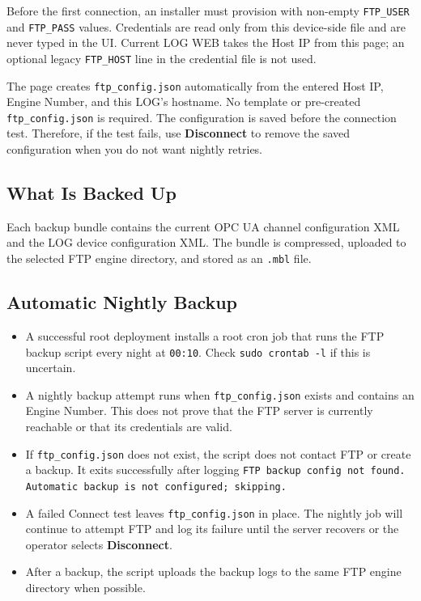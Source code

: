 \documentclass[11pt,a4paper]{article}
\begin{document}
Before the first connection, an installer must provision  with non-empty \texttt{FTP\_USER} and \texttt{FTP\_PASS} values. Credentials are read only from this device-side file and are never typed in the UI. Current LOG WEB takes the Host IP from this page; an optional legacy \texttt{FTP\_HOST} line in the credential file is not used.

The page creates \texttt{ftp\_config.json} automatically from the entered Host IP, Engine Number, and this LOG's hostname. No template or pre-created \texttt{ftp\_config.json} is required. The configuration is saved before the connection test. Therefore, if the test fails, use \textbf{Disconnect} to remove the saved configuration when you do not want nightly retries.

\subsection{What Is Backed Up}
Each backup bundle contains the current OPC UA channel configuration XML and the LOG device configuration XML. The bundle is compressed, uploaded to the selected FTP engine directory, and stored as an \texttt{.mbl} file.

\subsection{Automatic Nightly Backup}
\begin{itemize}
\item A successful root deployment installs a root cron job that runs the FTP backup script every night at \texttt{00:10}. Check \texttt{sudo crontab -l} if this is uncertain.
\item A nightly backup attempt runs when \texttt{ftp\_config.json} exists and contains an Engine Number. This does not prove that the FTP server is currently reachable or that its credentials are valid.
\item If \texttt{ftp\_config.json} does not exist, the script does not contact FTP or create a backup. It exits successfully after logging \texttt{FTP backup config not found. Automatic backup is not configured; skipping.}
\item A failed Connect test leaves \texttt{ftp\_config.json} in place. The nightly job will continue to attempt FTP and log its failure until the server recovers or the operator selects \textbf{Disconnect}.
\item After a backup, the script uploads the backup logs to the same FTP engine directory when possible.
\end{itemize}
\end{document}
